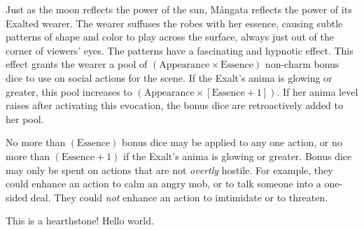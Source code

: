
Just as the moon reflects the power of the sun, Mångata reflects the power of
its Exalted wearer. The wearer suffuses the robes with her essence, causing
subtle patterns of shape and color to play across the surface, always just out
of the corner of viewers' eyes. The patterns have a fascinating and hypnotic
effect. This effect grants the wearer a pool of $(\mathrm{Appearance} \times
\mathrm{Essence})$ non-charm bonus dice to use on social actions for the scene.
If the Exalt's anima is glowing or greater, this pool increases to
$(\mathrm{Appearance} \times [\mathrm{Essence} + 1])$. If her anima level
raises after activating this evocation, the bonus dice are retroactively added
to her pool.

No more than $(\mathrm{Essence})$ bonus dice may be applied to any one action,
or no more than $(\mathrm{Essence} + 1)$ if the Exalt's anima is glowing or
greater. Bonus dice may only be spent on actions that are not \emph{overtly}
hostile. For example, they could enhance an action to calm an angry mob, or to
talk someone into a one-sided deal. They could \emph{not} enhance an action to
imtimidate or to threaten.


This is a hearthstone! Hello world.


